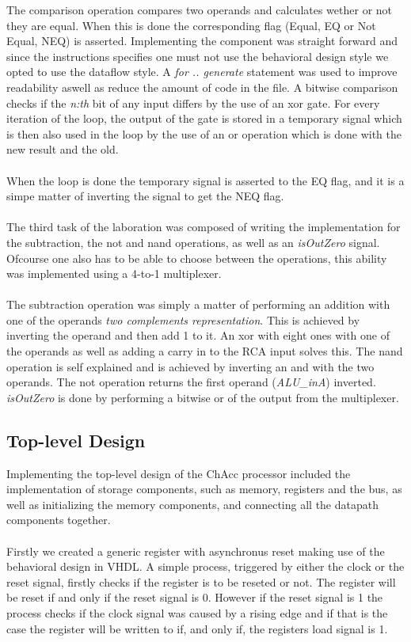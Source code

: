 \documentclass[a4paper,11pt]{article}
\begin{document}
\noindent
The comparison operation compares two operands and calculates wether or not 
they are equal. When this is done the corresponding flag (Equal, EQ or Not 
Equal, NEQ) is asserted. Implementing the component was straight forward and 
since the instructions specifies one must not use the behavioral design style 
we opted to use the dataflow style. A {\it for .. generate} statement was used 
to improve readability aswell as reduce the amount of code in the file. A 
bitwise comparison checks if the {\it n:th} bit of any input differs by the 
use of an xor gate. For every iteration of the loop, the output of the gate is 
stored in a temporary signal which is then also used in the loop by the use 
of an or operation which is done with the new result and the old.\\\\
\noindent
When the loop is done the temporary signal is asserted to the EQ flag, and it 
is a simpe matter of inverting the signal to get the NEQ flag.\\\\
\noindent
The third task of the laboration was composed of writing the implementation 
for the subtraction, the not and nand operations, as well as an {\it isOutZero} 
signal. Ofcourse one also has to be able to choose between the 
operations, this ability  was implemented using a 4-to-1 multiplexer.\\\\
\noindent
The subtraction operation was simply a matter of performing an addition with 
one of the operands {\it two complements representation}. This is achieved by 
inverting the operand and then add 1 to it. An xor with eight ones with one of 
the operands as well as adding a carry in to the RCA input solves this. The 
nand operation is self explained and is achieved by inverting an and with the 
two operands. The not operation returns the first operand ({\it ALU\_inA}) 
inverted. {\it isOutZero} is done by performing a bitwise or of the output 
from the multiplexer.

\subsection{Top-level Design}
Implementing the top-level design of the ChAcc processor included the 
implementation of storage components, such as memory, registers and the 
bus, as well as initializing the memory components, and connecting all the 
datapath components together.\\\\
\noindent
Firstly we created a generic register with asynchronus reset making use 
of the behavioral design in VHDL. A simple process, triggered by either 
the clock or the reset signal, firstly checks if the register is to be reseted 
or not. The register will be reset if and only if the reset signal is 0. 
However if the reset signal is 1 the process checks if the clock signal was 
caused by a rising edge and if that is the case the register will be written 
to if, and only if, the registers load signal is 1.
\end{document}
